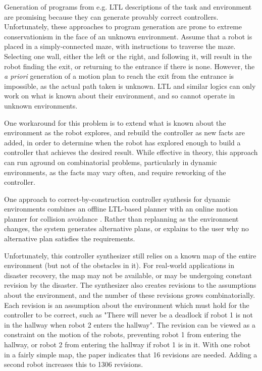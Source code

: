 Generation of programs from e.g. LTL descriptions of the task and environment are promising because they can generate provably correct controllers.
Unfortunately, these approaches to program generation are prone to extreme conservationism in the face of an unknown environment. 
Assume that a robot is placed in a simply-connected maze, with instructions to traverse the maze. 
Selecting one wall, either the left or the right, and following it, will result in the robot finding the exit, or returning to the entrance if there is none. 
However, the \emph{a priori} generation of a motion plan to reach the exit from the entrance is impossible, as the actual path taken is unknown. 
LTL and similar logics can only work on what is known about their environment, and so cannot operate in unknown environments. 
	
One workaround for this problem is to extend what is known about the environment as the robot explores, and rebuild the controller as new facts are added, in order to determine when the robot has explored enough to build a controller that achieves the desired result. 
While effective in theory, this approach can run aground on combinatorial problems, particularly in dynamic environments, as the facts may vary often, and require reworking of the controller. 

One approach to correct-by-construction controller synthesis for dynamic environments combines an offline LTL-based planner with an online motion planner for collision avoidance \citep{alonso2018reactive}. 
Rather than replanning as the environment changes, the system generates alternative plans, or explains to the user why no alternative plan satisfies the requirements.  

Unfortunately, this controller synthesizer still relies on a known map of the entire environment (but not of the obstacles in it). 
For real-world applications in disaster recovery, the map may not be available, or may be undergoing constant revision by the disaster. 
The synthesizer also creates revisions to the assumptions about the environment, and the number of these revisions grows combinatorially. 
Each revision is an assumption about the environment which must hold for the controller to be correct, such as "There will never be a deadlock if robot 1 is not in the hallway when robot 2 enters the hallway".
The revision can be viewed as a constraint on the motion of the robots, preventing robot 1 from entering the hallway, or robot 2 from entering the hallway if robot 1 is in it. 
With one robot in a fairly simple map, the paper indicates that 16 revisions are needed. 
Adding a second robot increases this to 1306 revisions.  

